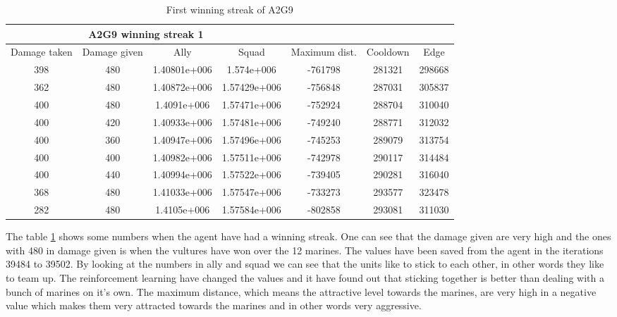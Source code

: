 \begin{centering}
\begin{table}

 \begin{tabular}{|c|c|c|c|c|c|c|}
	\multicolumn{4}{c}{A2G9 winning streak 1} \\
	\hline
	Damage taken & Damage given & Ally & Squad & Maximum dist. & Cooldown & Edge \\
	\hline
		398&480& 1.40801e+006&1.574e+006&-761798&281321&298668\\
		362&480&1.40872e+006&1.57429e+006&-756848&287031&305837\\
		400&480&1.4091e+006&1.57471e+006&-752924&288704&310040\\
		400&420&1.40933e+006&1.57481e+006&-749240&288771&312032\\
		400&360&1.40947e+006&1.57496e+006&-745253&289079&313754\\
		400&400&1.40982e+006&1.57511e+006&-742978&290117&314484\\
		400&440&1.40994e+006&1.57522e+006&-739405&290281&316040\\
		368&480&1.41033e+006&1.57547e+006&-733273&293577&323478\\
		282&480&1.4105e+006&1.57584e+006&-802858&293081&311030\\
	\hline
\end{tabular}

	\label{winning_streak_1.1}
	\caption{First winning streak of A2G9}
\end{table}
\end{centering}
The table \ref{winning_streak_1.1} shows some numbers when the agent have had a winning streak. One can see that the damage given are very high and the ones with 480 in damage given is when the vultures have won over the 12 marines. The values have been saved from the agent in the iterations 39484 to 39502. By looking at the numbers in ally and squad we can see that the units like to stick to each other, in other words they like to team up. The reinforcement learning have changed the values and it have found out that sticking together is better than dealing with a bunch of marines on it's own. The maximum distance, which means the attractive level towards the marines, are very high in a negative value which makes them very attracted towards the marines and in other words very aggressive. 







